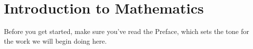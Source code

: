 \chapter{Introduction to Mathematics}

Before you get started, make sure you've read the Preface, which sets the tone for the work we will begin doing here.

